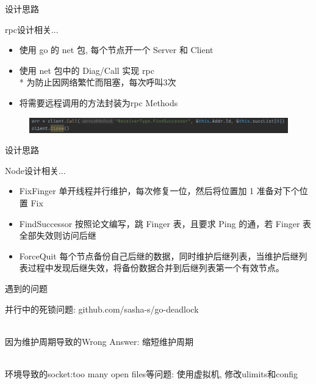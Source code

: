 \documentclass[10pt]{beamer}
\begin{document}
\begin{frame}{设计思路}

rpc设计相关...

\begin{itemize}
\item 使用 go 的 net 包, 每个节点开一个 Server 和 Client
\item 使用 net 包中的 Diag/Call 实现 rpc \\
	   * 为防止因网络繁忙而阻塞，每次呼叫3次
\item 将需要远程调用的方法封装为rpc Methods
\end{itemize}

\begin{figure}
\centering
\includegraphics[scale=0.5]{figure/code3.png}
\end{figure}

\end{frame}

\begin{frame}{设计思路}

Node设计相关...

\begin{itemize}
\item \alert{FixFinger} 单开线程并行维护，每次修复一位，然后将位置加 1 准备对下个位置 Fix
\item \alert{FindSuccessor} 按照论文编写，跳 Finger 表，且要求 Ping 的通，若 Finger 表全部失效则访问后继
\item \alert{ForceQuit} 每个节点备份自己后继的数据，同时维护后继列表，当维护后继列表过程中发现后继失效，将备份数据合并到后继列表第一个有效节点。
\end{itemize}

\end{frame}

\begin{frame}{遇到的问题}

并行中的\alert{死锁}问题: github.com/sasha-s/go-deadlock

\\[20pt]

因为维护周期导致的\alert{Wrong Answer}: 缩短维护周期

\\[20pt]

环境导致的\alert{socket:too many open files}等问题: 使用虚拟机, 修改ulimits和config

\end{frame}
\end{document}

